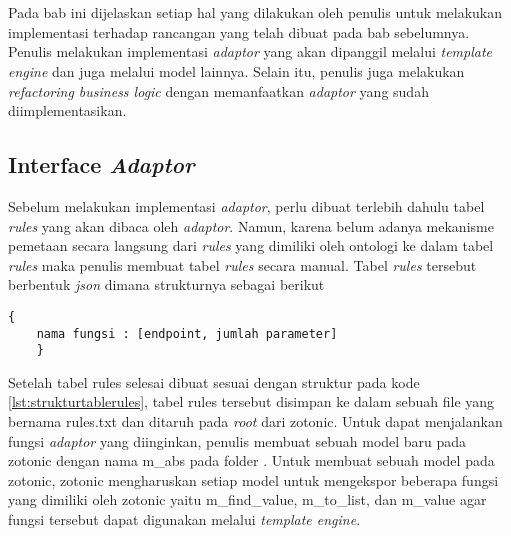 \chapter{\babEmpat}

Pada bab ini dijelaskan setiap hal yang dilakukan oleh penulis untuk melakukan implementasi terhadap rancangan yang telah dibuat pada bab sebelumnya. Penulis melakukan implementasi \textit{adaptor} yang akan dipanggil melalui \textit{template engine} dan juga melalui model lainnya. Selain itu, penulis juga melakukan \textit{refactoring business logic} dengan memanfaatkan \textit{adaptor} yang sudah diimplementasikan.

\section{Interface \textit{Adaptor}}

Sebelum melakukan implementasi \textit{adaptor}, perlu dibuat terlebih dahulu tabel \textit{rules} yang akan dibaca oleh \textit{adaptor}. Namun, karena belum adanya mekanisme pemetaan secara langsung dari \textit{rules} yang dimiliki oleh ontologi ke dalam tabel \textit{rules} maka penulis membuat tabel \textit{rules} secara manual. Tabel \textit{rules} tersebut berbentuk \textit{json} dimana strukturnya sebagai berikut

\begin{minipage}{\linewidth}
	\begin{lstlisting}[caption={Struktur tabel \textit{rules}},label={lst:strukturtablerules}]
	{
	nama fungsi : [endpoint, jumlah parameter]
	}
	\end{lstlisting}
\end{minipage}

Setelah tabel rules selesai dibuat sesuai dengan struktur pada kode \ref{lst:strukturtablerules}, tabel rules tersebut disimpan ke dalam sebuah file yang bernama rules.txt dan ditaruh pada \textit{root} dari zotonic. Untuk dapat menjalankan fungsi \textit{adaptor} yang diinginkan, penulis membuat sebuah model baru pada zotonic dengan nama m\_abs pada folder . Untuk membuat sebuah model pada zotonic, zotonic mengharuskan setiap model untuk mengekspor beberapa fungsi yang dimiliki oleh zotonic yaitu m\_find\_value, m\_to\_list, dan m\_value agar fungsi tersebut dapat digunakan melalui \textit{template engine}.

